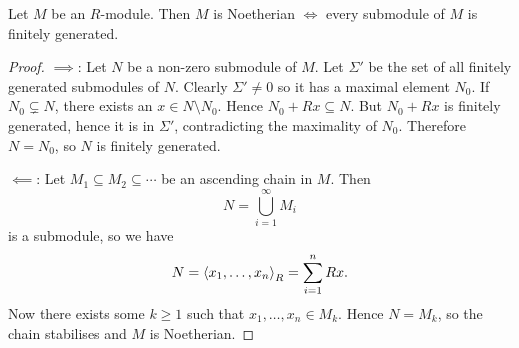 \begin{prop}[3.2]
  Let $M$ be an $R$-module.
  Then $M$ is Noetherian $\iff$ every submodule of $M$ is finitely generated.
\end{prop}

\begin{proof}
  $\implies$:
  Let $N$ be a non-zero submodule of $M$.
  Let $\Sigma'$ be the set of all finitely generated submodules of $N$.
  Clearly $\Sigma' \neq 0$ so it has a maximal element $N_0$.
  If $N_0 \subsetneq N$, there exists an $x \in N \setminus N_0$.
  Hence $N_0 + Rx \subseteq N$.
  But $N_0 + Rx$ is finitely generated, hence it is in $\Sigma'$, contradicting the maximality of $N_0$.
  Therefore $N=N_0$, so $N$ is finitely generated.

  $\impliedby$:
  Let $M_1 \subseteq M_2 \subseteq \cdots$ be an ascending chain in $M$.
  Then
  \[ N = \bigcup_{i=1}^\infty M_i \]
  is a submodule, so we have
  \[ N = {\left\langle x_1,\ldots,x_n \right\rangle}_R = \sum_{i=1}^n Rx. \]
  Now there exists some $k \geq 1$ such that $x_1,\ldots,x_n \in M_k$.
  Hence $N=M_k$, so the chain stabilises and $M$ is Noetherian.
\end{proof}
